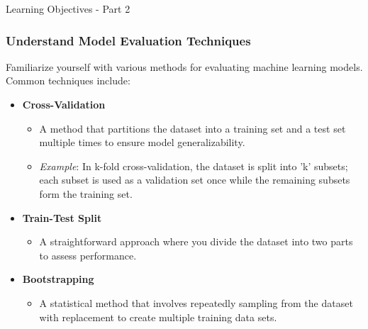 \documentclass[aspectratio=169]{beamer}
\begin{document}
\begin{frame}[fragile]{Learning Objectives - Part 2}
    \frametitle{Understand Model Evaluation Techniques}
    
    Familiarize yourself with various methods for evaluating machine learning models. Common techniques include:
    
    \begin{itemize}
        \item \textbf{Cross-Validation}
        \begin{itemize}
            \item A method that partitions the dataset into a training set and a test set multiple times to ensure model generalizability.
            \item \textit{Example}: In k-fold cross-validation, the dataset is split into 'k' subsets; each subset is used as a validation set once while the remaining subsets form the training set.
        \end{itemize}
        
        \item \textbf{Train-Test Split}
        \begin{itemize}
            \item A straightforward approach where you divide the dataset into two parts to assess performance.
        \end{itemize}
        
        \item \textbf{Bootstrapping}
        \begin{itemize}
            \item A statistical method that involves repeatedly sampling from the dataset with replacement to create multiple training data sets.
        \end{itemize}
    \end{itemize}
\end{frame}
\end{document}
